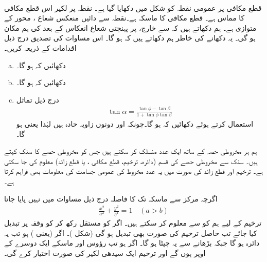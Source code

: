 \\
قطع مکافی  پر عمومی نقطہ  کو شکل  میں دکھایا گیا ہے۔ نقطہ  پر لکیر  اس قطع مکافی کا مماس ہے۔ قطع مکافی کا ماسکہ  ہے۔نقطہ  سے دائیں منعکس شعاع ، محور  کے متوازی  ہے۔ ہم دکھاتے ہیں کہ  سے خارج،  پر پہنچتی شعاع انعکاس کے بعد  کی ہم مکان ہو گی۔ یہ دکھانے کی خاطر ہم دکھاتے ہیں کہ  ہو گا۔ اس مساوات کی تصدیق درج ذیل اقدامات کے ذریعہ کریں۔
\begin{enumerate}[a.]
\item
دکھائیں کہ  ہو گا۔
\item
دکھائیں کہ  ہو گا۔
\item
درج ذیل تماثل
\begin{align*}
\tan \alpha=\frac{\tan \phi-\tan\beta}{1+\tan\phi\tan\beta}
\end{align*}
استعمال کرتے ہوئے دکھائیں کہ  ہو گا۔چونکہ  اور  دونوں زاویہ حادہ ہیں لہٰذا
  یعنی  ہو گا۔ 
\end{enumerate}  



ہم ہر مخروطی حصہ  کے ساتھ ایک عدد منسلک کر سکتے ہیں جس کو مخروطی حصے کا سنک کہتے ہیں۔ سنک سے مخروطی حصے کی قسم (دائرہ، ترخیم، قطع مکافی ، یا قطع زائد) معلوم کی جا سکتی ہے۔ ترخیم اور قطع زائد کی صورت میں یہ عدد مخروط کی عمومی جسامت کی معلومات بھی فراہم کرتا ہے۔

اگرچہ مرکز سے ماسکہ تک کا  فاصلہ  درج ذیل مساوات میں نہیں پایا جاتا 
\begin{align*}
\frac{x^2}{a^2}+\frac{y^2}{b^2}=1\quad (a>b)
\end{align*}
ترخیم کے لیے ہم  کو  سے معلوم کر سکتے ہیں۔ اگر  کو مستقل رکھ کر  کو وقفہ  پر تبدیل کیا جائے تب حاصل ترخیم کی صورت  بھی تبدیل ہو گی (شکل )۔ اگر  (یعنی ) ہو تب یہ دائرہ ہو گا جبکہ  بڑھانے سے یہ چپٹا ہو گا۔ اگر  ہو تب رؤوس  اور ماسکے ایک دوسرے کے اوپر ہوں گے اور ترخیم ایک سیدھی لکیر کی صورت اختیار کرے گی۔

